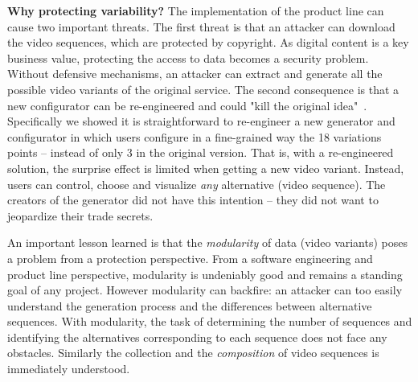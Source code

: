 \documentclass{sig-alternate}
\newcommand\ma[1]{\todo[color=green!40,inline]{TODO (Mathieu): #1}}
\newcommand\ma[1]{}
\newcommand{\wprv}[0]{\emph{Why variability should be protected?}\xspace}
\renewcommand{\wprv}[0]{\textbf{Why protecting variability?}\xspace}
\begin{document}

\wprv
%
 The implementation of the product line can cause two important threats. 
The first threat is that an attacker can download the video sequences, which are protected by copyright. As digital content is a key business value, protecting the access to data becomes a security problem. Without defensive mechanisms, an attacker can extract and generate all the possible video variants of the original service. 
%
 The second consequence is that a new configurator can be re-engineered and could "kill the original idea"~\cite{BrefVamos14}. Specifically we showed it is straightforward to re-engineer a new generator and configurator in which users configure in a fine-grained way the 18 variations points -- instead of only 3 in the original version.
That is, with a re-engineered solution, the surprise effect is limited when getting a new video variant. Instead, users can control, choose and visualize \emph{any} alternative (video sequence). The creators of the generator did not have this intention  -- they did not want to jeopardize their trade secrets.




An important lesson learned is that the \emph{modularity} of data (video variants) poses a problem from a protection perspective.  
From a software engineering and product line perspective, modularity is undeniably good and remains a standing goal of any project. However modularity can backfire: an attacker can too easily understand the generation process and the differences between alternative sequences. 
With modularity, the task of determining the number of sequences and identifying the alternatives corresponding to each sequence does not face any obstacles. Similarly the collection and the \emph{composition} of video sequences is immediately understood. 
\end{document}
